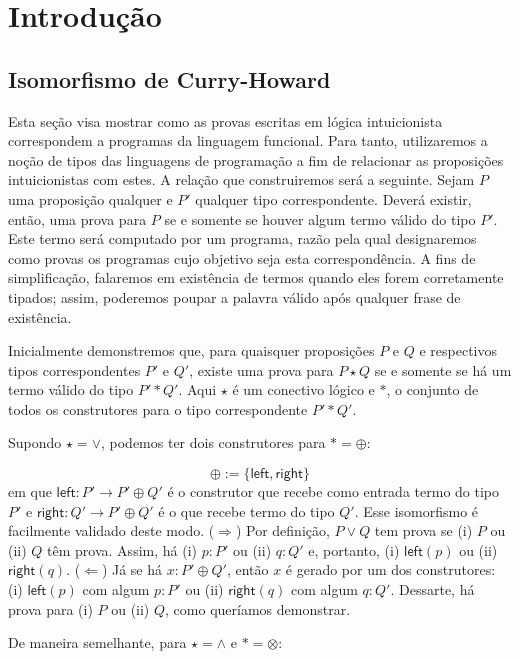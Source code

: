 \chapter{Introdução}

\section{Isomorfismo de Curry-Howard}

Esta seção visa mostrar como as provas escritas em lógica intuicionista correspondem a programas da linguagem funcional. Para tanto, utilizaremos a noção de tipos das linguagens de programação a fim de relacionar as proposições intuicionistas com estes. A relação que construiremos será a seguinte. Sejam $P$ uma proposição qualquer e $P'$ qualquer tipo correspondente. Deverá existir, então, uma prova para $P$ se e somente se houver algum termo válido do tipo $P'$. Este termo será computado por um programa, razão pela qual designaremos como provas os programas cujo objetivo seja esta correspondência. A fins de simplificação, falaremos em existência de termos quando eles forem corretamente tipados; assim, poderemos poupar a palavra válido após qualquer frase de existência.

Inicialmente demonstremos que, para quaisquer proposições $P$ e $Q$ e respectivos tipos correspondentes $P'$ e $Q'$, existe uma prova para $P \star Q$ se e somente se há um termo válido do tipo $P' \ast Q'$. Aqui $\star$ é um conectivo lógico e $\ast$, o conjunto de todos os construtores para o tipo correspondente $P' \ast Q'$.

Supondo $\star = \vee$, podemos ter dois construtores para $\ast = \oplus$:

$$\oplus := \{ \textsf{left}, \textsf{right} \}$$ em que $\textsf{left} : P' \to P' \oplus Q'$ é o construtor que recebe como entrada termo do tipo $P'$ e $\textsf{right} : Q' \to P' \oplus Q'$ é o que recebe termo do tipo $Q'$. Esse isomorfismo é facilmente validado deste modo. ($\Rightarrow$) Por definição, $P \vee Q$ tem prova se (i) $P$ ou (ii) $Q$ têm prova. Assim, há (i) $p:P'$ ou (ii) $q:Q'$ e, portanto, (i) $\textsf{left} (p)$ ou (ii) $\textsf{right} (q)$. ($\Leftarrow$) Já se há $x:P' \oplus Q'$, então $x$ é gerado por um dos construtores: (i) $\textsf{left} (p)$ com algum $p:P'$ ou (ii) $\textsf{right} (q)$ com algum $q:Q'$. Dessarte, há prova para (i) $P$ ou (ii) $Q$, como queríamos demonstrar.

De maneira semelhante, para $\star = \wedge$ e $\ast = \otimes$:

